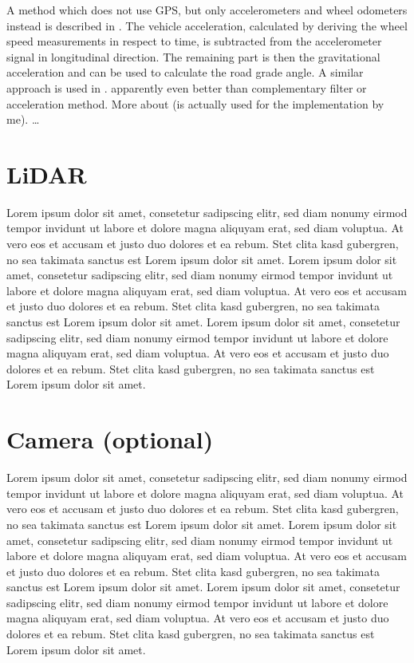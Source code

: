 A method which does not use GPS, but only accelerometers and wheel odometers instead is described in \cite{Nilsson2012}.
The vehicle acceleration, calculated by deriving the wheel speed measurements in respect to time, is subtracted from the accelerometer signal in longitudinal direction.
The remaining part is then the gravitational acceleration and can be used to calculate the road grade angle.
A similar approach is used in \cite{Sentouh2008}.
 \cite{He2020} apparently even better than complementary filter or acceleration method.
More about \cite{Palella2016} (is actually used for the implementation by me).
\dots\\


\section{LiDAR}
Lorem ipsum dolor sit amet, consetetur sadipscing elitr, sed diam nonumy eirmod tempor invidunt ut labore et dolore magna aliquyam erat, sed diam voluptua.
At vero eos et accusam et justo duo dolores et ea rebum. Stet clita kasd gubergren, no sea takimata sanctus est Lorem ipsum dolor sit amet.
Lorem ipsum dolor sit amet, consetetur sadipscing elitr, sed diam nonumy eirmod tempor invidunt ut labore et dolore magna aliquyam erat, sed diam voluptua.
At vero eos et accusam et justo duo dolores et ea rebum. Stet clita kasd gubergren, no sea takimata sanctus est Lorem ipsum dolor sit amet.
Lorem ipsum dolor sit amet, consetetur sadipscing elitr, sed diam nonumy eirmod tempor invidunt ut labore et dolore magna aliquyam erat, sed diam voluptua.
At vero eos et accusam et justo duo dolores et ea rebum. Stet clita kasd gubergren, no sea takimata sanctus est Lorem ipsum dolor sit amet.

\section{Camera (optional)}
Lorem ipsum dolor sit amet, consetetur sadipscing elitr, sed diam nonumy eirmod tempor invidunt ut labore et dolore magna aliquyam erat, sed diam voluptua.
At vero eos et accusam et justo duo dolores et ea rebum. Stet clita kasd gubergren, no sea takimata sanctus est Lorem ipsum dolor sit amet.
Lorem ipsum dolor sit amet, consetetur sadipscing elitr, sed diam nonumy eirmod tempor invidunt ut labore et dolore magna aliquyam erat, sed diam voluptua.
At vero eos et accusam et justo duo dolores et ea rebum. Stet clita kasd gubergren, no sea takimata sanctus est Lorem ipsum dolor sit amet.
Lorem ipsum dolor sit amet, consetetur sadipscing elitr, sed diam nonumy eirmod tempor invidunt ut labore et dolore magna aliquyam erat, sed diam voluptua.
At vero eos et accusam et justo duo dolores et ea rebum. Stet clita kasd gubergren, no sea takimata sanctus est Lorem ipsum dolor sit amet.
